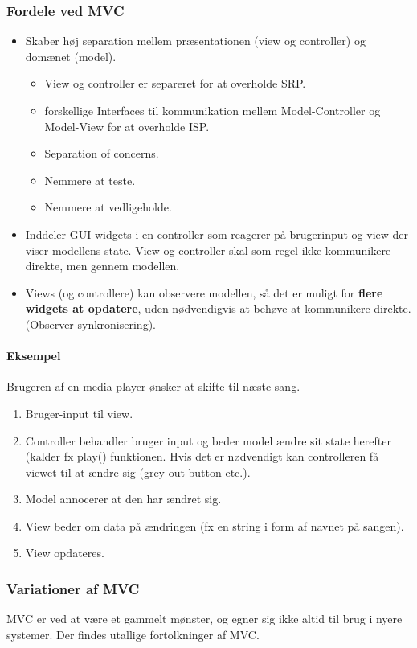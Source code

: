 \subsubsection{Fordele ved MVC}
\begin{itemize}
	\item Skaber høj separation mellem præsentationen (view og controller) og domænet (model).
	\begin{itemize}
		\item View og controller er separeret for at overholde SRP.
		\item forskellige Interfaces til kommunikation mellem Model-Controller og Model-View for at overholde ISP.
		\item Separation of concerns.
		\item Nemmere at teste.
		\item Nemmere at vedligeholde.
	\end{itemize}
	\item Inddeler GUI widgets i en controller som reagerer på brugerinput og view der viser modellens state. View og controller skal som regel ikke kommunikere direkte, men gennem modellen.
	\item Views (og controllere) kan observere modellen, så det er muligt for \textbf{flere widgets at opdatere}, uden nødvendigvis at behøve at kommunikere direkte. (Observer synkronisering).
\end{itemize}

\paragraph{Eksempel}
Brugeren af en media player ønsker at skifte til næste sang.

\begin{enumerate}
	\item Bruger-input til view.
	\item Controller behandler bruger input og beder model ændre sit state herefter (kalder fx play() funktionen. Hvis det er nødvendigt kan controlleren få viewet til at ændre sig (grey out button etc.).
	\item Model annocerer at den har ændret sig.
	\item View beder om data på ændringen (fx en string i form af navnet på sangen).
	\item View opdateres.
\end{enumerate}

\subsubsection{Variationer af MVC}
MVC er ved at være et gammelt mønster, og egner sig ikke altid til brug i nyere systemer. Der findes utallige fortolkninger af MVC.

